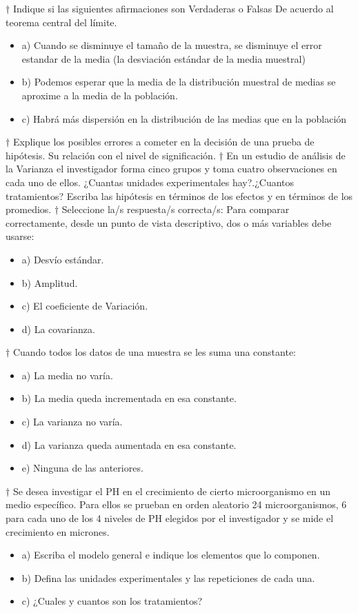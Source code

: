 \documentclass[10pt,a4paper]{article}
\begin{document}
$\dagger$ Indique si las siguientes afirmaciones son Verdaderas o Falsas
De acuerdo al teorema central del límite. 
\begin{itemize}
	\item a) Cuando se disminuye el tamaño de la muestra, se disminuye el error estandar de la media (la desviación estándar de la media muestral)
	\item b) Podemos esperar que la media de la distribución muestral de medias se aproxime a la media de la población. 
	\item c) Habrá más dispersión en la distribución de las medias que en la población 
\end{itemize}
$\dagger$ Explique los posibles errores a cometer en la decisión de una prueba de hipótesis. Su relación con el nivel de significación. 
$\dagger$ En un estudio de análisis de la Varianza el investigador forma cinco grupos y toma cuatro observaciones en cada uno de ellos. ¿Cuantas unidades experimentales hay?.¿Cuantos tratamientos? Escriba las hipótesis en términos de los efectos y en términos de los promedios. 
$\dagger$ Seleccione la/s respuesta/s correcta/s:
Para comparar correctamente, desde un punto de vista descriptivo, dos o más variables debe usarse:
\begin{itemize}
	\item a) Desvío estándar.
	\item b) Amplitud.
	\item c) El coeficiente de Variación.
	\item d) La covarianza. 
\end{itemize}
$\dagger$ Cuando todos los datos de una muestra se les suma una constante:
\begin{itemize}
	\item a) La media no varía. 
	\item b) La media queda incrementada en esa constante. 
	\item c) La varianza no varía.
	\item d) La varianza queda aumentada en esa constante.
	\item e) Ninguna de las anteriores.  
\end{itemize}
$\dagger$ Se desea investigar el PH en el crecimiento de cierto microorganismo en un medio específico. Para ellos se prueban en orden aleatorio 24 microorganismos, 6 para cada uno de los 4 niveles de PH elegidos por el investigador y se mide el crecimiento en micrones. 
\begin{itemize}
	\item a) Escriba el modelo general e indique los elementos que lo componen. 
	\item b) Defina las unidades experimentales y las repeticiones de cada una. 
	\item c) ¿Cuales y cuantos son los tratamientos?
\end{itemize}
\end{document}
